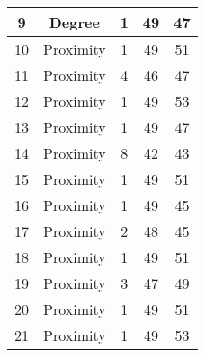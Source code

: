 \documentclass[results.tex]{subfiles}
\begin{document}
\begin{center}
\begin{tabular}{| c || c | c | c | c |}
            \hline
            9                       & Degree                       & 1                      & 49                      & 47                   \\
            \hline
            10                      & Proximity                    & 1                      & 49                      & 51                   \\
            \hline
            11                      & Proximity                    & 4                      & 46                      & 47                   \\
            \hline
            12                      & Proximity                    & 1                      & 49                      & 53                   \\
            \hline
            13                      & Proximity                    & 1                      & 49                      & 47                   \\
            \hline
            14                      & Proximity                    & 8                      & 42                      & 43                   \\
            \hline
            15                      & Proximity                    & 1                      & 49                      & 51                   \\
            \hline
            16                      & Proximity                    & 1                      & 49                      & 45                   \\
            \hline
            17                      & Proximity                    & 2                      & 48                      & 45                   \\
            \hline
            18                      & Proximity                    & 1                      & 49                      & 51                   \\
            \hline
            19                      & Proximity                    & 3                      & 47                      & 49                   \\
            \hline
            20                      & Proximity                    & 1                      & 49                      & 51                   \\
            \hline
            21                      & Proximity                    & 1                      & 49                      & 53                   \\

\end{tabular}
\end{center}
\end{document}
